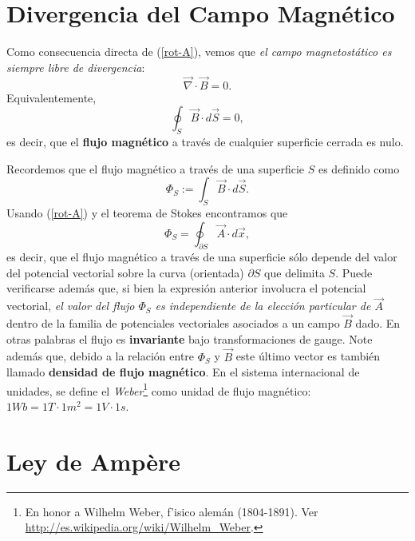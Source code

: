 \section{Divergencia del Campo Magnético}

Como consecuencia directa de (\ref{rot-A}), vemos que \textit{el campo magnetostático
es siempre libre de divergencia}:
\begin{equation}
 \boxed{\vec{\nabla}\cdot\vec{B}=0.} \label{divB}
\end{equation}
Equivalentemente,
\begin{equation}
 \oint_S\vec{B}\cdot d\vec{S}=0,
\end{equation}
es decir, que el \textbf{flujo magnético} a través de cualquier superficie cerrada es nulo.

Recordemos que el flujo magnético a través de una superficie $S$ es definido
como
\begin{equation}
 \Phi_S:= \int_S\vec{B}\cdot d\vec{S}.
\end{equation}
Usando (\ref{rot-A}) y el teorema de Stokes encontramos que
\begin{equation}\label{PAdx}
 \Phi_S=\oint_{\partial S}\vec{A}\cdot d\vec{x},
\end{equation}
es decir, que el flujo magnético a través de una superficie sólo depende del
valor del potencial vectorial sobre la curva (orientada) $\partial S$ que delimita $S$.
Puede verificarse además que, si bien la expresión anterior involucra el
potencial vectorial, \textit{el valor del flujo $\Phi_S$ es independiente de la
elección particular de $\vec{A}$} dentro de la familia de potenciales
vectoriales asociados a un campo $\vec B$ dado. En otras palabras el flujo es
\textbf{invariante} bajo transformaciones de gauge. Note además que, debido a la
relación entre $\Phi_S$ y $\vec{B}$ este último vector es también llamado
\textbf{densidad de flujo magnético}. En el sistema internacional de unidades, se define el \textit{Weber}\footnote{En honor a Wilhelm Weber, f'isico alemán (1804-1891). Ver \url{http://es.wikipedia.org/wiki/Wilhelm_Weber}.} como unidad de flujo magnético: $1Wb=1T\cdot 1m^2=1V\cdot 1s$.

\section{Ley de Amp\`ere}


